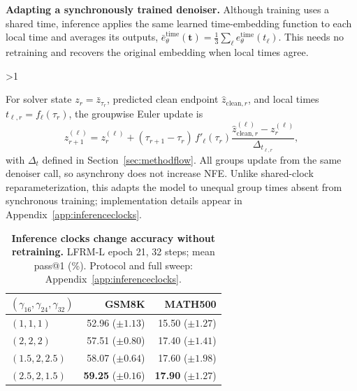 \documentclass{article}
\begin{document}
\textbf{Adapting a synchronously trained denoiser.}
Although training uses a shared time, inference applies the same learned time-embedding function to each local time and averages its outputs, $\bar e_\theta^{\mathrm{time}}(\bm t)=\frac13\sum_\ell e_\theta^{\mathrm{time}}(t_\ell)$. This needs no retraining and recovers the original embedding when local times agree.

\par
\ifnum\value{WF@wrappedlines}>1
  \vspace{\dimexpr\value{WF@wrappedlines}\baselineskip\relax}
\fi
\WFclear

For solver state $z_r=\bar z_{\tau_r}$, predicted clean endpoint $\widehat z_{\mathrm{clean},r}$, and local times $t_{\ell,r}=f_\ell(\tau_r)$, the groupwise Euler update is
\begin{equation}
 z_{r+1}^{(\ell)}=z_r^{(\ell)}+
 (\tau_{r+1}-\tau_r)\,f'_\ell(\tau_r)
 \frac{\widehat z_{\mathrm{clean},r}^{(\ell)}-z_r^{(\ell)}}
 {\Delta_{t_{\ell,r}}},
 \label{eq:asyncsampler}
\end{equation}
with $\Delta_t$ defined in Section~\ref{sec:methodflow}. All groups update from the same denoiser call, so asynchrony does not increase NFE. Unlike shared-clock reparameterization, this adapts the model to unequal group times absent from synchronous training; implementation details appear in Appendix~\ref{app:inferenceclocks}.

\begin{table}
\vspace{-\baselineskip}
\centering\small
\setlength{\tabcolsep}{3pt}
\caption{\small\textbf{Inference clocks change accuracy without retraining.} LFRM-L epoch 21, 32 steps; mean pass@1 (\%). Protocol and full sweep: Appendix~\ref{app:inferenceclocks}.}
\label{tab:inferenceclocks}
\begin{tabular}{@{}lrr@{}}
\toprule
$(\gamma_{16},\gamma_{24},\gamma_{32})$ & GSM8K & MATH500 \\
\midrule
$(1,1,1)$ & 52.96 {\scriptsize($\pm 1.13$)} & 15.50 {\scriptsize($\pm 1.27$)} \\
$(2,2,2)$ & 57.51 {\scriptsize($\pm 0.80$)} & 17.40 {\scriptsize($\pm 1.41$)} \\
$(1.5,2,2.5)$ & 58.07 {\scriptsize($\pm 0.64$)} & 17.60 {\scriptsize($\pm 1.98$)} \\
$(2.5,2,1.5)$ & \textbf{59.25} {\scriptsize($\pm 0.16$)} & \textbf{17.90} {\scriptsize($\pm 1.27$)} \\
\bottomrule
\end{tabular}
\vspace{-\baselineskip}
\end{table}
\end{document}
